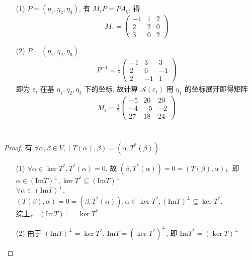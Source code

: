 \documentclass{article}
\begin{document}
\begin{itemize}
    \item [(1)] $P = (\eta_1, \eta_2, \eta_3)$, 有 $M_\varepsilon P = PA_\eta$, 得 $$M_\varepsilon = \begin{pmatrix}
        -1 & 1 & 2 \\
        2 & 2 & 0 \\
        3 & 0 & 2
    \end{pmatrix}$$
    \item [(2)] $P = (\eta_1, \eta_2, \eta_3)$. 
    \begin{align*}
        P^{-1} = \frac{1}{7}\begin{pmatrix}
            -1 & 3 & 3 \\
            2 & 6 & -1 \\
            2 & -1 & 1
        \end{pmatrix}
    \end{align*}
    即为 $\varepsilon_i$ 在基 $\eta_1, \eta_2, \eta_3$ 下的坐标. 故计算 $\mathcal{A}(\varepsilon_i)$ 用 $\eta_1$ 的坐标展开即得矩阵
    \begin{align*}
        M_\varepsilon = \frac{1}{7}\begin{pmatrix}
            -5 & 20 & 20 \\
            -4 & -5 & -2 \\
            27 & 18 & 24
        \end{pmatrix}
    \end{align*}
\end{itemize}

\section{}

\begin{proof}
    有 $\forall \alpha, \beta \in V, (T(\alpha), \beta) = (\alpha, T^*(\beta)) $
    \begin{itemize}
        \item [(1)] $\forall \alpha \in \ker T^*, T^*(\alpha) = 0$. 故 $(\beta, T^*(\alpha)) = 0 = (T(\beta), \alpha)$，即 $\alpha \in (\mathrm{Im} T)^\perp , \ker T^* \subseteq (\mathrm{Im} T)^\perp$ \\
        $\forall \alpha \in (\mathrm{Im} T)^\perp$, $(T(\beta), \alpha) = 0 = (\beta, T^*(\alpha)), \alpha \in \ker T^*, (\mathrm{Im} T)^\perp \subseteq \ker T^*$. \\
        综上， $(\mathrm{Im} T)^\perp = \ker T^*$
        \item [(2)] 由于 $(\mathrm{Im} T)^\perp = \ker T^*$, $\mathrm{Im} T = (\ker T^*)^\perp$, 即 $\mathrm{Im} T^* = (\ker T)^\perp$
    \end{itemize}
\end{proof}
\end{document}
